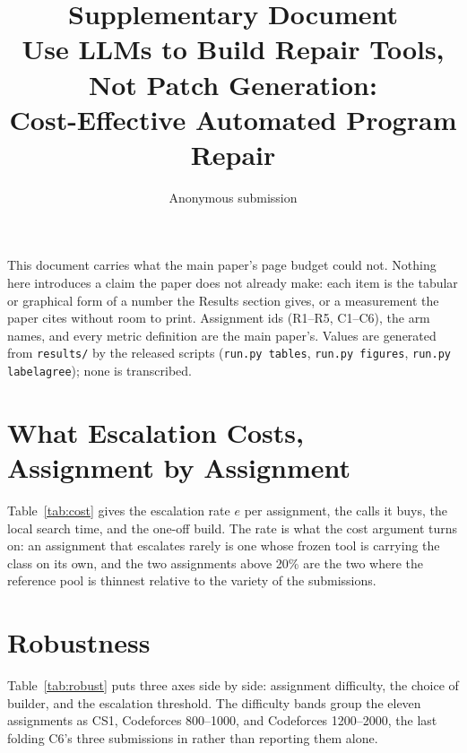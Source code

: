 \documentclass[letterpaper]{article}
\title{Supplementary Document\\
\large Use LLMs to Build Repair Tools, Not Patch Generation:\\Cost-Effective
Automated Program Repair}
\author{Anonymous submission}
\begin{document}
\maketitle

\noindent This document carries what the main paper's page budget could not.
Nothing here introduces a claim the paper does not already make: each item is
the tabular or graphical form of a number the Results section gives, or a
measurement the paper cites without room to print. Assignment ids (R1--R5,
C1--C6), the arm names, and every metric definition are the main paper's.
Values are generated from \texttt{results/} by the released scripts
(\texttt{run.py tables}, \texttt{run.py figures}, \texttt{run.py labelagree});
none is transcribed.

\section{What Escalation Costs, Assignment by Assignment}

Table~\ref{tab:cost} gives the escalation rate $e$ per assignment, the calls it
buys, the local search time, and the one-off build. The rate is what the cost
argument turns on: an assignment that escalates rarely is one whose frozen tool
is carrying the class on its own, and the two assignments above 20\% are the
two where the reference pool is thinnest relative to the variety of the
submissions.

\begin{table}[h]
\centering\small\setlength{\tabcolsep}{4pt}

\caption{Escalation and cost per assignment, \texttt{claude-sonnet-5}.}
\label{tab:cost}
\end{table}

\section{Robustness}

Table~\ref{tab:robust} puts three axes side by side: assignment difficulty, the
choice of builder, and the escalation threshold. The difficulty bands group the
eleven assignments as CS1, Codeforces 800--1000, and Codeforces 1200--2000, the
last folding C6's three submissions in rather than reporting them alone.

\begin{table}[h]
\centering\scriptsize\setlength{\tabcolsep}{1pt}
\resizebox{\columnwidth}{!}{}
\caption{Difficulty, builder, and escalation threshold.}
\label{tab:robust}
\end{table}
\end{document}
